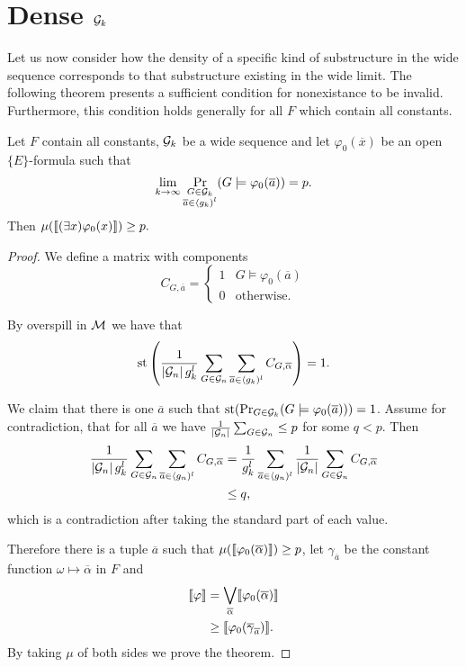 \section{Dense $\mathcal{G}_k$}

Let us now consider how the density of a specific kind of substructure in the wide sequence corresponds to that substructure existing in the wide limit. The following theorem presents a sufficient condition for nonexistance to be invalid. Furthermore, this condition holds generally for all $F$ which contain all constants.

\begin{thrm}\label{thrmexists}
Let $F$ contain all constants, $\mathcal{G}_k$ be a wide sequence and let $\varphi_0(\overline x)$ be an open $\{E\}$-formula such that
\[\lim_{k\to\infty}\Pr_{\substack{G\in\mathcal{G}_k\\\overline a \in \langle g_k)^l}}(G\models\varphi_0(\overline a))=p.\]
Then $\mu(\llbracket(\exists x)\varphi_0(x)\rrbracket)\geq p.$
\end{thrm}

\begin{proof}
We define a matrix with components 
\[C_{G,\overline a}=\begin{cases}1&G\models\varphi_0(\overline a)\\0&\text{otherwise}.\end{cases}\]

By overspill in $\mathcal{M}$ we have that
\[\text{st}\left (\frac{1}{\left|{\mathcal{G}_n}\right|g_k^l}\sum_{G\in\mathcal{G}_n}\sum_{\overline a \in \langle g_k)^l}C_{G,\overline \alpha}\right )=1.\]

We claim that there is one $\overline a$ such that $\text{st}(\Pr_{G\in\mathcal{G}_k}(G\models\varphi_0(\overline a)))=1$. Assume for contradiction, that for all $\overline a$ we have $\frac{1}{\left|{\mathcal{G}_n}\right|}\sum_{G\in \mathcal{G}_n}\leq p$ for some $q<p$. Then
\begin{align}
\frac{1}{\left|{\mathcal{G}_n}\right|g_k^l}\sum_{G\in\mathcal{G}_n}\sum_{\overline a \in \langle g_n)^l}C_{G,\overline \alpha}&=
\frac{1}{g_k^l}\sum_{\overline a\in\langle g_n)^l}\frac{1}{\left|{\mathcal{G}_n}\right|}\sum_{G\in\mathcal{G}_n}C_{G,\overline \alpha}\\
&\leq q,
\end{align}
which is a contradiction after taking the standard part of each value.

Therefore there is a tuple $\overline a$ such that $\mu(\llbracket\varphi_0(\overline\alpha)\rrbracket)\geq p$, let $\gamma_{\overline a}$ be the constant function $\omega \mapsto \overline \alpha$ in $F$ and
\begin{align}
\llbracket\varphi\rrbracket&=\bigvee_{\overline\alpha}\llbracket\varphi_0(\overline\alpha)\rrbracket\\
&\geq \llbracket\varphi_0(\overline \gamma_{\overline a})\rrbracket.
\end{align}
By taking $\mu$ of both sides we prove the theorem.
\end{proof}

